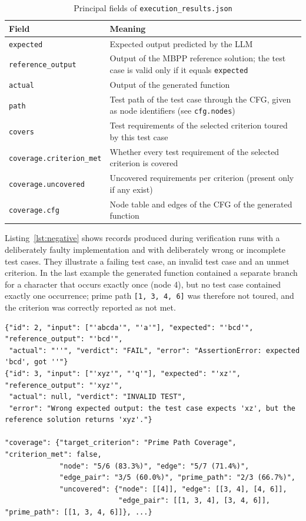 \documentclass[11pt, a4paper]{article}
\begin{document}
\begin{table}[H]
    \centering
    \small
    \begin{tabularx}{\textwidth}{>{\raggedright\arraybackslash}p{4.4cm}X}
        \toprule
        \textbf{Field} & \textbf{Meaning} \\
        \midrule
        \texttt{expected} & Expected output predicted by the LLM \\
        \texttt{reference\_output} & Output of the MBPP reference solution; the test case is valid only if it equals \texttt{expected} \\
        \texttt{actual} & Output of the generated function \\
        \texttt{path} & Test path of the test case through the CFG, given as node identifiers (see \texttt{cfg.nodes}) \\
        \texttt{covers} & Test requirements of the selected criterion toured by this test case \\
        \texttt{coverage.criterion\_met} & Whether every test requirement of the selected criterion is covered \\
        \texttt{coverage.uncovered} & Uncovered requirements per criterion (present only if any exist) \\
        \texttt{coverage.cfg} & Node table and edges of the CFG of the generated function \\
        \bottomrule
    \end{tabularx}
    \caption{Principal fields of \texttt{execution\_results.json}}
    \label{tab:fields}
\end{table}

Listing~\ref{lst:negative} shows records produced during verification runs with a deliberately faulty implementation and with deliberately wrong or incomplete test cases. They illustrate a failing test case, an invalid test case and an unmet criterion. In the last example the generated function contained a separate branch for a character that occurs exactly once (node 4), but no test case contained exactly one occurrence; prime path \texttt{[1, 3, 4, 6]} was therefore not toured, and the criterion was correctly reported as not met.

\begin{lstlisting}[style=text, caption={Examples of a failing test case, an invalid test case and an unmet criterion}, label={lst:negative}]
{"id": 2, "input": ["'abcda'", "'a'"], "expected": "'bcd'", "reference_output": "'bcd'",
 "actual": "''", "verdict": "FAIL", "error": "AssertionError: expected 'bcd', got ''"}
{"id": 3, "input": ["'xyz'", "'q'"], "expected": "'xz'", "reference_output": "'xyz'",
 "actual": null, "verdict": "INVALID TEST",
 "error": "Wrong expected output: the test case expects 'xz', but the reference solution returns 'xyz'."}

"coverage": {"target_criterion": "Prime Path Coverage", "criterion_met": false,
             "node": "5/6 (83.3%)", "edge": "5/7 (71.4%)",
             "edge_pair": "3/5 (60.0%)", "prime_path": "2/3 (66.7%)",
             "uncovered": {"node": [[4]], "edge": [[3, 4], [4, 6]],
                           "edge_pair": [[1, 3, 4], [3, 4, 6]], "prime_path": [[1, 3, 4, 6]]}, ...}
\end{lstlisting}
\end{document}

